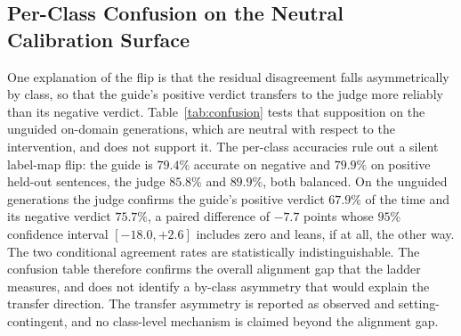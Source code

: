 \subsection{Per-Class Confusion on the Neutral Calibration Surface}
\label{app:guided-confusion}

One explanation of the flip is that the residual disagreement falls asymmetrically by class,
so that the guide's positive verdict transfers to the judge more reliably than its negative
verdict. Table~\ref{tab:confusion} tests that supposition on the unguided on-domain
generations, which are neutral with respect to the intervention, and does not support it. The
per-class accuracies rule out a silent label-map flip: the guide is $79.4\%$ accurate on
negative and $79.9\%$ on positive held-out sentences, the judge $85.8\%$ and $89.9\%$, both
balanced.
On the unguided generations the judge confirms the guide's positive verdict $67.9\%$ of the
time and its negative verdict $75.7\%$, a paired difference of $-7.7$ points whose $95\%$
confidence interval $[-18.0, +2.6]$ includes zero and leans, if at all, the other way.
The two conditional agreement rates are statistically indistinguishable. The confusion table
therefore confirms the overall alignment gap that the ladder measures, and does not identify a
by-class asymmetry that would explain the transfer direction. The transfer asymmetry is
reported as observed and setting-contingent, and no class-level mechanism is claimed beyond
the alignment gap.




